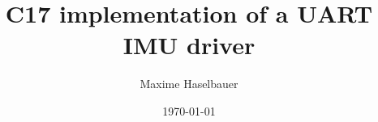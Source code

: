 \documentclass[a4paper,10pt]{article}
\title{C\raisebox{0.25ex}{++}17 implementation of a UART IMU driver}
\author{Maxime Haselbauer}
\date{\today}
\begin{document}
\maketitle

\printnomenclature
\printglossaries









\printbibliography
\end{document}
